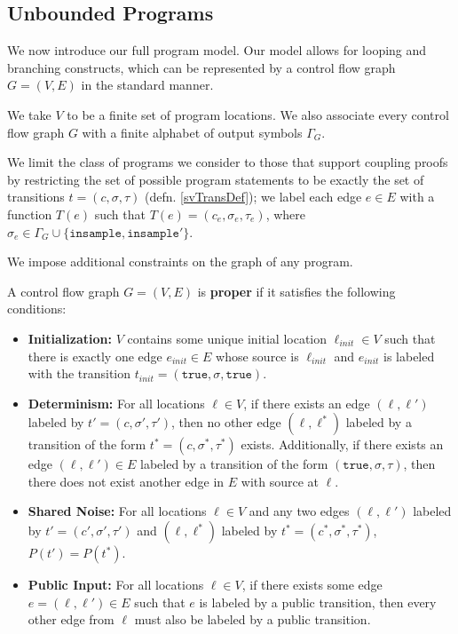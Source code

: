 
\subsection{Unbounded Programs}

We now introduce our full program model. Our model allows for looping and branching constructs, which can be represented by a control flow graph $G = (V, E)$ in the standard manner. 

We take $V$ to be a finite set of program locations. We also associate every control flow graph $G$ with a finite alphabet of output symbols $\Gamma_G$.

We limit the class of programs we consider to those that support coupling proofs by restricting the set of possible program statements to be exactly the set of transitions $t = (c, \sigma, \tau)$ (defn. \ref{svTransDef}); we label each edge $e\in E$ with a function $T(e)$ such that $T(e) = (c_e, \sigma_e, \tau_e)$, where $\sigma_e \in \Gamma_G\cup\{\texttt{insample}, \texttt{insample}'\}$. 

We impose additional constraints on the graph of any program. 

\begin{defn}
    A control flow graph $G = (V, E)$ is \textbf{proper} if it satisfies the following conditions: 
    \begin{itemize}
        \item \textbf{Initialization:} $V$ contains some unique initial location $\ell_{init}\in V$ such that there is exactly one edge $e_{init}\in E$ whose source is $\ell_{init}$ and $e_{init}$ is labeled with the transition $t_{init} = (\texttt{true}, \sigma, \texttt{true})$.
        \item \textbf{Determinism:} For all locations $\ell\in V$, if there exists an edge $(\ell, \ell')$ labeled by $t'=(c, \sigma', \tau')$, then no other edge $(\ell, \ell^*)$ labeled by a transition of the form $t^* = (c, \sigma^*, \tau^*)$ exists. 
        Additionally, if there exists an edge $(\ell, \ell')\in E$ labeled by a transition of the form $(\texttt{true}, \sigma, \tau)$, then there does not exist another edge in $E$ with source at $\ell$.
        \item \textbf{Shared Noise:} For all locations $\ell\in V$ and any two edges $(\ell, \ell')$ labeled by $t'=(c', \sigma', \tau')$ and $(\ell, \ell^*)$ labeled by $t^* = (c^*, \sigma^*, \tau^*)$, $P(t') = P(t^*)$. 
        \item \textbf{Public Input:} For all locations $\ell\in V$, if there exists some edge $e = (\ell, \ell') \in E$ such that $e$ is labeled by a public transition, then every other edge from $\ell$ must also be labeled by a public transition. 
\end{itemize}
\end{defn}


